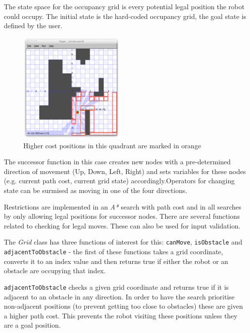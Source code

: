 \documentclass[a4paper,12pt]{article}
\begin{document}
The state space for the occupancy grid is every potential legal position the robot could occupy. The initial state is the hard-coded occupancy grid, the goal state is defined by the user.
\begin{figure}
    \begin{center}
            \includegraphics[width=0.47\textwidth]{images/Path_Cost_Grid.png}
            \caption{Higher cost positions in this quadrant are marked in orange}
    \end{center}
\end{figure}

The successor function in this case creates new nodes with a pre-determined direction of movement (Up, Down, Left, Right) and sets variables for these nodes (e.g. current path cost, current grid state) accordingly.Operators for changing state can be surmised as moving in one of the four directions. 

Restrictions are implemented in an \textit{A*} search with path cost and in all searches by only allowing legal positions for successor nodes. There are several functions related to checking for legal moves. These can also be used for input validation.

The \textit{Grid} class has three functions of interest for this: \texttt{canMove}, \texttt{isObstacle} and \texttt{adjacentToObstacle} - the first of these functions takes a grid coordinate, converts it to an index value and then returns true if either the robot or an obstacle are occupying that index.

\texttt{adjacentToObstacle} checks a given grid coordinate and returns true if it is adjacent to an obstacle in any direction. In order to have the search prioritise non-adjacent positions (to prevent getting too close to obstacles) these are given a higher path cost. This prevents the robot visiting these positions unless they are a goal position.
\end{document}
